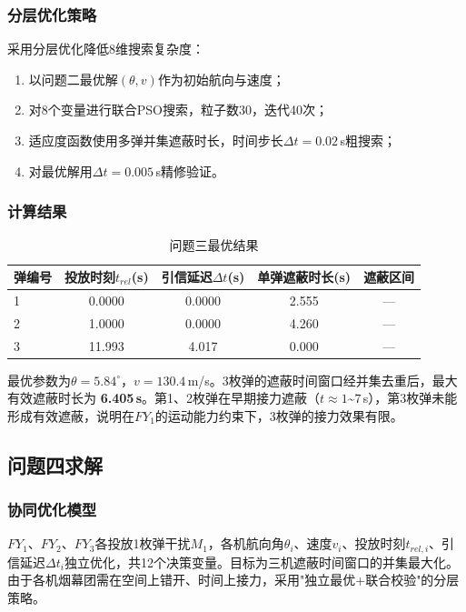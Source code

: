 \documentclass[12pt,a4paper]{article}
\begin{document}
\subsubsection{分层优化策略}

采用分层优化降低8维搜索复杂度：
\begin{enumerate}[nosep]
  \item 以问题二最优解$(\theta, v)$作为初始航向与速度；
  \item 对8个变量进行联合PSO搜索，粒子数30，迭代40次；
  \item 适应度函数使用多弹并集遮蔽时长，时间步长$\Delta t=0.02$\,s粗搜索；
  \item 对最优解用$\Delta t=0.005$\,s精修验证。
\end{enumerate}

\subsubsection{计算结果}

\begin{table}[H]
\centering
\caption{问题三最优结果}
\begin{tabular}{lcccc}
\toprule
弹编号 & 投放时刻$t_{rel}$(s) & 引信延迟$\Delta t$(s) & 单弹遮蔽时长(s) & 遮蔽区间 \\
\midrule
1 & 0.0000 & 0.0000 & 2.555 & --- \\
2 & 1.0000 & 0.0000 & 4.260 & --- \\
3 & 11.993 & 4.017 & 0.000 & --- \\
\bottomrule
\end{tabular}
\end{table}

最优参数为$\theta = 5.84^\circ$，$v = 130.4$\,m/s。3枚弹的遮蔽时间窗口经并集去重后，最大有效遮蔽时长为 \textbf{6.405\,s}。第1、2枚弹在早期接力遮蔽（$t \approx 1$\textasciitilde$7$\,s），第3枚弹未能形成有效遮蔽，说明在$FY_1$的运动能力约束下，3枚弹的接力效果有限。

\subsection{问题四求解}

\subsubsection{协同优化模型}

$FY_1$、$FY_2$、$FY_3$各投放1枚弹干扰$M_1$，各机航向角$\theta_i$、速度$v_i$、投放时刻$t_{rel,i}$、引信延迟$\Delta t_i$独立优化，共12个决策变量。目标为三机遮蔽时间窗口的并集最大化。由于各机烟幕团需在空间上错开、时间上接力，采用"独立最优+联合校验"的分层策略。
\end{document}

